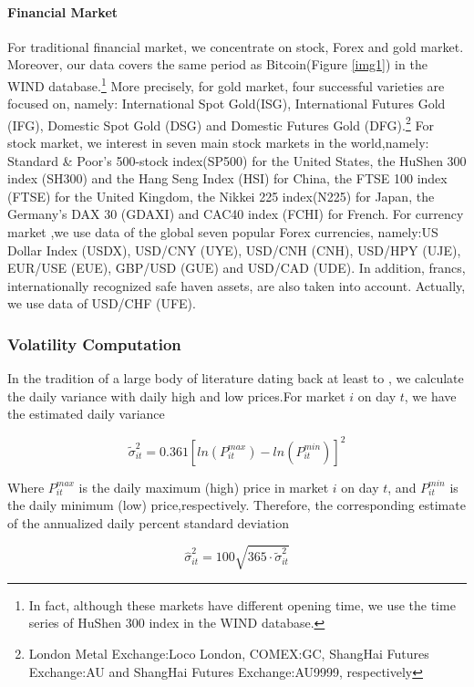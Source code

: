 \documentclass[review]{elsarticle}
\begin{document}
\paragraph{Financial Market}For traditional financial market, we concentrate on stock, Forex and gold market. Moreover, our data covers the same period as Bitcoin(Figure \ref{img1}) in the WIND database.\footnote{In fact, although these markets have different opening time, we use the time series of HuShen 300 index in the WIND database.} More precisely, for gold market, four successful varieties are focused on, namely: International Spot Gold(ISG), International Futures Gold (IFG), Domestic Spot Gold (DSG) and Domestic Futures Gold (DFG).\footnote{London Metal Exchange:Loco London, COMEX:GC, ShangHai Futures Exchange:AU and ShangHai Futures Exchange:AU9999, respectively} For stock market, we interest in seven main stock markets in the world,namely: Standard \& Poor's 500-stock index(SP500) for the United States, the HuShen 300 index (SH300) and  the Hang Seng Index (HSI) for China, the FTSE 100 index (FTSE) for the United Kingdom, the Nikkei 225 index(N225) for Japan, the Germany’s DAX 30 (GDAXI) and CAC40 index (FCHI) for French. For currency market ,we use data of the global seven popular Forex currencies, namely:US Dollar Index (USDX), USD/CNY (UYE), USD/CNH (CNH), USD/HPY (UJE), EUR/USE (EUE), GBP/USD (GUE) and USD/CAD (UDE). In addition, francs, internationally recognized safe haven assets, are also taken into account. Actually, we use data of USD/CHF (UFE).

\subsubsection{Volatility Computation}
In the tradition of a large body of literature dating back at least to \cite{parkinson1980extreme}, we calculate the daily variance with daily high and low prices.For market $i$ on day $t$, we have the estimated daily variance

\begin{equation}
	\widetilde{\sigma}_{it}^2 = 0.361[ln(P_{it}^{max})-ln(P_{it}^{min})]^2
\end{equation}

Where $P_{it}^{max}$ is the daily maximum (high) price in market $i$ on day $t$, and $P_{it}^{min}$ is the daily minimum (low) price,respectively. Therefore, the corresponding estimate of the annualized daily percent standard deviation 

\begin{equation}
	\hat{\sigma}_{it}^2 = 100 \sqrt{365 \cdot \widetilde{\sigma}_{it}^2}
\end{equation}
\end{document}
